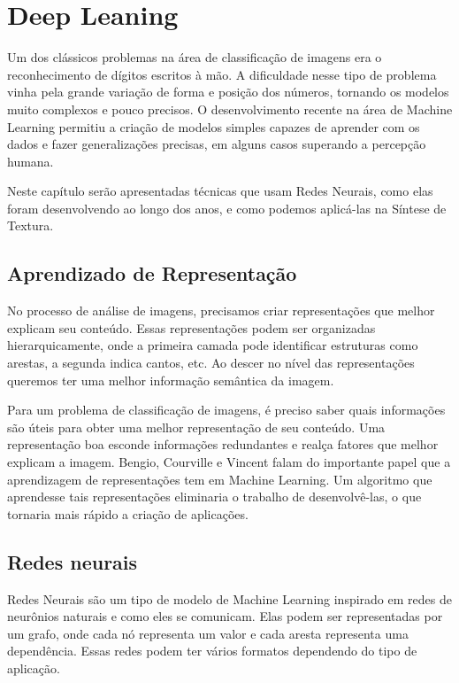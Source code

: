 \chapter{Deep Leaning}


Um dos clássicos problemas na área
de classificação de imagens era o
reconhecimento de dígitos
escritos à mão. 
A dificuldade nesse tipo de problema
vinha pela grande variação de forma
e posição dos números, tornando 
os modelos muito complexos e pouco
precisos. O desenvolvimento
recente na área de Machine Learning
permitiu a criação de modelos
simples capazes de aprender com
os dados e fazer generalizações
precisas, em alguns casos
superando a percepção humana.

Neste capítulo serão apresentadas
técnicas que usam Redes Neurais,
como elas foram desenvolvendo
ao longo dos anos, e como podemos
aplicá-las na Síntese de Textura.



\section{Aprendizado de Representação}


No processo de análise de imagens,
precisamos criar representações
que melhor explicam seu conteúdo.
Essas representações podem ser organizadas
hierarquicamente, onde
a primeira camada pode identificar estruturas como
arestas, a segunda indica cantos, etc.
Ao descer no nível das representações
queremos ter uma melhor informação
semântica da imagem.


Para um problema de classificação de imagens,
é preciso saber quais informações são 
úteis para obter uma melhor 
representação de seu conteúdo. 
Uma representação boa esconde informações
redundantes e realça fatores que 
melhor explicam a imagem.
Bengio, Courville e Vincent
\cite{Bengio2014} falam do importante
papel que a aprendizagem
de representações tem em Machine Learning.
Um algoritmo que aprendesse tais representações
eliminaria o trabalho de desenvolvê-las,
o que tornaria mais rápido a criação de aplicações.


\section{Redes neurais}



Redes Neurais são um tipo 
de modelo de Machine Learning inspirado
em redes de neurônios naturais e como
eles se comunicam. Elas podem ser
representadas por um grafo, onde
cada nó representa um valor e cada aresta
representa uma dependência. Essas
redes podem ter vários formatos
dependendo do tipo de aplicação.

